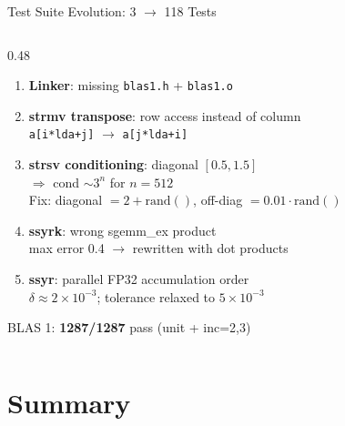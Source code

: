 \documentclass[aspectratio=169,10pt]{beamer}
\begin{document}
\begin{frame}{Test Suite Evolution: 3 $\to$ 118 Tests}
\begin{columns}
\begin{column}{0.48\textwidth}
\begin{enumerate}
        \item \textbf{Linker}: missing \texttt{blas1.h} + \texttt{blas1.o}
        \item \textbf{strmv transpose}: row access instead of column\\
              \texttt{a[i*lda+j]} $\to$ \texttt{a[j*lda+i]}
        \item \textbf{strsv conditioning}: diagonal $[0.5,1.5]$\\
              $\Rightarrow$ cond $\sim 3^n$ for $n=512$\\
              Fix: diagonal $= 2+\text{rand}()$, off-diag $= 0.01\cdot\text{rand}()$
        \item \textbf{ssyrk}: wrong sgemm\_ex product\\
              max error 0.4 $\to$ rewritten with dot products
        \item \textbf{ssyr}: parallel FP32 accumulation order\\
              $\delta \approx 2\times10^{-3}$; tolerance relaxed to $5\times10^{-3}$
      \end{enumerate}
      \vspace{0.3em}
      BLAS 1: \textbf{1287/1287} pass (unit + inc=2,3)
    \end{column}
  \end{columns}
\end{frame}

\section{Summary}
\end{document}
